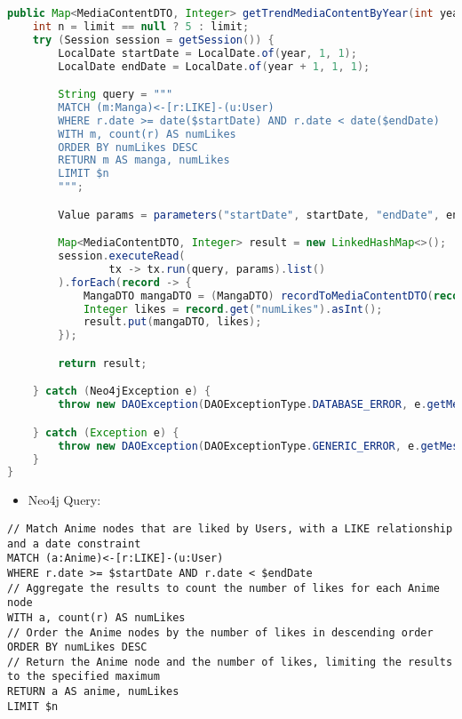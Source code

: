 \begin{mdframed}[style=customstyle]
\begin{lstlisting}[language=java]
public Map<MediaContentDTO, Integer> getTrendMediaContentByYear(int year, Integer limit) throws DAOException {
    int n = limit == null ? 5 : limit;
    try (Session session = getSession()) {
        LocalDate startDate = LocalDate.of(year, 1, 1);
        LocalDate endDate = LocalDate.of(year + 1, 1, 1);

        String query = """
        MATCH (m:Manga)<-[r:LIKE]-(u:User)
        WHERE r.date >= date($startDate) AND r.date < date($endDate)
        WITH m, count(r) AS numLikes
        ORDER BY numLikes DESC
        RETURN m AS manga, numLikes
        LIMIT $n
        """;

        Value params = parameters("startDate", startDate, "endDate", endDate, "n", n);

        Map<MediaContentDTO, Integer> result = new LinkedHashMap<>();
        session.executeRead(
                tx -> tx.run(query, params).list()
        ).forEach(record -> {
            MangaDTO mangaDTO = (MangaDTO) recordToMediaContentDTO(record);
            Integer likes = record.get("numLikes").asInt();
            result.put(mangaDTO, likes);
        });

        return result;

    } catch (Neo4jException e) {
        throw new DAOException(DAOExceptionType.DATABASE_ERROR, e.getMessage());

    } catch (Exception e) {
        throw new DAOException(DAOExceptionType.GENERIC_ERROR, e.getMessage());
    }
}\end{lstlisting}
\end{mdframed}

\begin{itemize}
    \item Neo4j Query:
\end{itemize}

\begin{mdframed}[style=customstyle]
\begin{lstlisting}[language=Cypher]
// Match Anime nodes that are liked by Users, with a LIKE relationship and a date constraint
MATCH (a:Anime)<-[r:LIKE]-(u:User)
WHERE r.date >= $startDate AND r.date < $endDate
// Aggregate the results to count the number of likes for each Anime node
WITH a, count(r) AS numLikes
// Order the Anime nodes by the number of likes in descending order
ORDER BY numLikes DESC
// Return the Anime node and the number of likes, limiting the results to the specified maximum
RETURN a AS anime, numLikes
LIMIT $n\end{lstlisting}
\end{mdframed}

